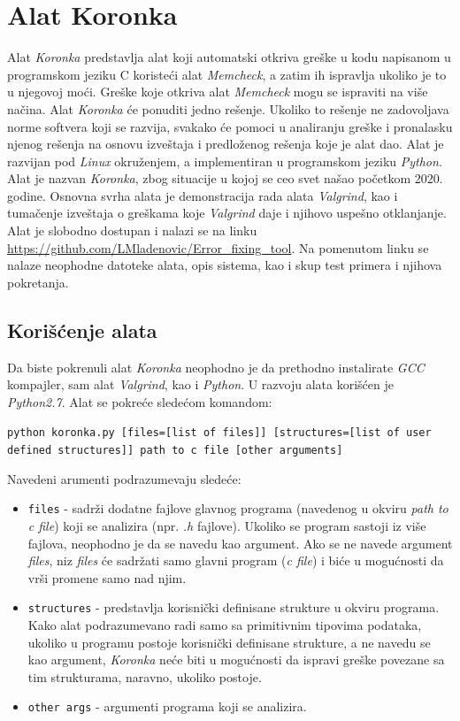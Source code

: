 \documentclass[12pt,oneside]{memoir}
\theoremstyle{plain}
\theoremstyle{definition}
\begin{document}

\chapter{Alat Koronka}
Alat \textit{Koronka} predstavlja alat koji automatski otkriva greške u kodu napisanom u programskom jeziku C koristeći alat \textit{Memcheck}, a zatim ih ispravlja ukoliko je to u njegovoj moći. Greške koje otkriva alat \textit{Memcheck} mogu se ispraviti na više načina. Alat \textit{Koronka} će ponuditi jedno rešenje. Ukoliko to rešenje ne zadovoljava norme softvera koji se razvija, svakako će pomoci u analiranju greške i pronalasku njenog rešenja na osnovu izveštaja i predloženog rešenja koje je alat dao. Alat je razvijan pod \textit{Linux} okruženjem, a implementiran u programskom jeziku \textit{Python}. Alat je nazvan \textit{Koronka}, zbog situacije u kojoj se ceo svet našao početkom 2020. godine. Osnovna svrha alata je demonstracija rada alata \textit{Valgrind}, kao i tumačenje izveštaja o greškama koje \textit{Valgrind} daje i njihovo uspešno otklanjanje. Alat je slobodno dostupan i nalazi se na linku \url{https://github.com/LMladenovic/Error_fixing_tool}. Na pomenutom linku se nalaze neophodne datoteke alata, opis sistema, kao i skup test primera i njihova pokretanja.

\section{Korišćenje alata}
Da biste pokrenuli alat \textit{Koronka} neophodno je da prethodno instalirate \textit{GCC} kompajler, sam alat \textit{Valgrind}, kao i \textit{Python}. U razvoju alata korišćen je \textit{Python2.7}. Alat se pokreće sledećom komandom:
\begin{center}
\texttt{python koronka.py [files=[list of files]] [structures=[list of user defined structures]] path to c file [other arguments]}
\end{center}
Navedeni arumenti podrazumevaju sledeće:
\begin{itemize}
\item \texttt{files} - sadrži dodatne fajlove glavnog programa (navedenog u okviru \textit{path to c file}) koji se analizira (npr. \textit{.h} fajlove). Ukoliko se program sastoji iz više fajlova, neophodno je da se navedu kao argument. Ako se ne navede argument \textit{files}, niz \textit{files} će sadržati samo glavni program (\textit{c file}) i biće u mogućnosti da vrši promene samo nad njim.
\item \texttt{structures} - predstavlja korisnički definisane strukture u okviru programa. Kako alat podrazumevano radi samo sa primitivnim tipovima podataka, ukoliko u programu postoje korisnički definisane strukture, a ne navedu se kao argument, \textit{Koronka} neće biti u mogućnosti da ispravi greške povezane sa tim strukturama, naravno, ukoliko postoje.
\item \texttt{other args} - argumenti programa koji se analizira.
\end{itemize}
\end{document}
